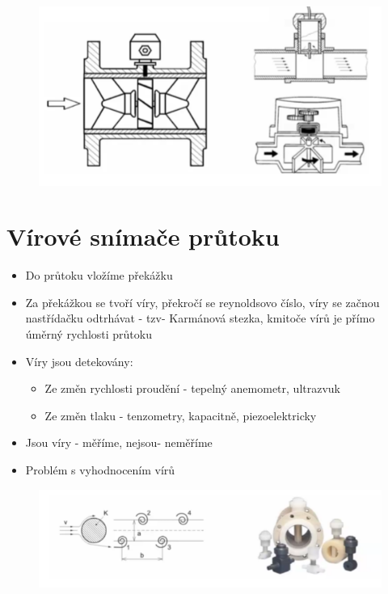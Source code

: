 \begin{figure}[h]
    \centering
    \includegraphics[scale = 0.7]{img/lopatkaaturbin.png}
\end{figure}

\section*{Vírové snímače průtoku}
\begin{itemize}
    \item Do průtoku vložíme překážku
    \item Za překážkou se tvoří víry, překročí se reynoldsovo číslo, víry se začnou nastřídačku odtrhávat - tzv- Karmánová stezka, kmitoče vírů je přímo úměrný rychlosti průtoku
    \item Víry jsou detekovány: \begin{itemize}
        \item Ze změn rychlosti proudění - tepelný anemometr, ultrazvuk
        \item Ze změn tlaku - tenzometry, kapacitně, piezoelektricky
    \end{itemize}
    \item Jsou víry - měříme, nejsou- neměříme
    \item Problém s vyhodnocením vírů
\end{itemize}

\begin{figure}[h]
    \centering
    \includegraphics[scale = 1]{img/ViroveSnimaceTrojskyVirPhishingBackdoormrkmrk.png}
\end{figure}

